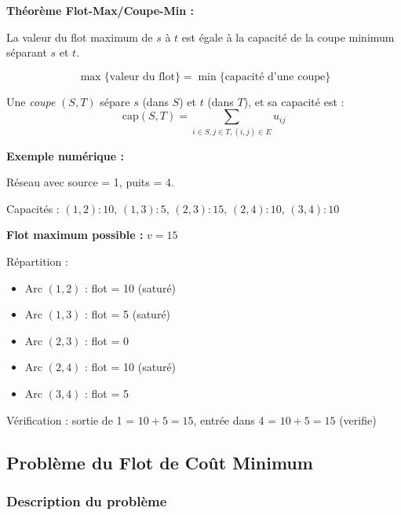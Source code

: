 \documentclass[12pt,a4paper]{article}
\begin{document}
\begin{astuce}
\textbf{Théorème Flot-Max/Coupe-Min :}

La valeur du flot maximum de $s$ à $t$ est égale à la capacité de la coupe minimum séparant $s$ et $t$.

$$\max \{\text{valeur du flot}\} = \min \{\text{capacité d'une coupe}\}$$

Une \textit{coupe} $(S, T)$ sépare $s$ (dans $S$) et $t$ (dans $T$), et sa capacité est :
$$\text{cap}(S,T) = \sum_{i \in S, j \in T, (i,j) \in E} u_{ij}$$
\end{astuce}

\begin{exemple}
\textbf{Exemple numérique :}

Réseau avec source = 1, puits = 4.

Capacités : $(1,2): 10$, $(1,3): 5$, $(2,3): 15$, $(2,4): 10$, $(3,4): 10$

\textbf{Flot maximum possible :} $v = 15$

Répartition :
\begin{itemize}
    \item Arc $(1,2)$ : flot = 10 (saturé)
    \item Arc $(1,3)$ : flot = 5 (saturé)
    \item Arc $(2,3)$ : flot = 0
    \item Arc $(2,4)$ : flot = 10 (saturé)
    \item Arc $(3,4)$ : flot = 5
\end{itemize}

Vérification : sortie de 1 = $10 + 5 = 15$, entrée dans 4 = $10 + 5 = 15$ (verifie)
\end{exemple}

\newpage
\subsection{Problème du Flot de Coût Minimum}

\subsubsection{Description du problème}
\end{document}
